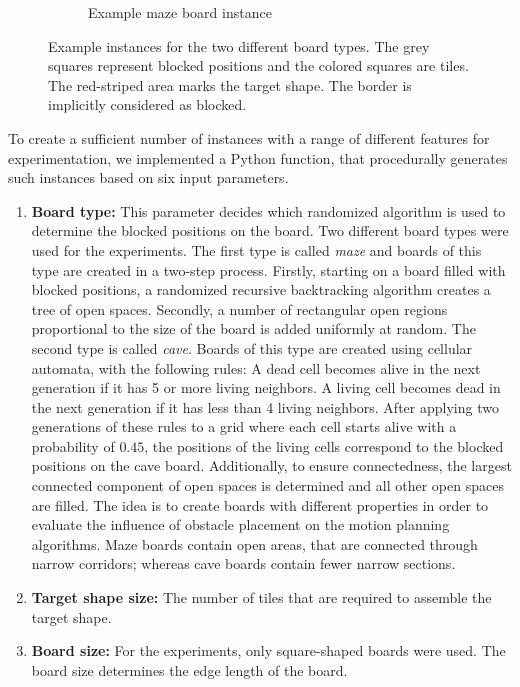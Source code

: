 \begin{figure}
\begin{subfigure}[b]{0.45\textwidth}
\caption{Example maze board instance}
\label{fig:maze}
\end{subfigure}
\caption[Example instances for the two different board types]{Example instances for the two different board types. The grey squares represent blocked positions and the colored squares are tiles. The red-striped area marks the target shape. The border is implicitly considered as blocked.}
\label{fig:instance_example}
\end{figure}

To create a sufficient number of instances with a range of different features for experimentation, we implemented a Python function, that procedurally generates such instances based on six input parameters.
\begin{enumerate}
\setlength\itemsep{-0.3em}
\item \textbf{Board type:} This parameter decides which randomized algorithm is used to determine the blocked positions on the board. Two different board types were used for the experiments. The first type is called \emph{maze} and boards of this type are created in a two-step process. Firstly, starting on a board filled with blocked positions, a randomized recursive backtracking algorithm creates a tree of open spaces. Secondly, a number of rectangular open regions proportional to the size of the board is added uniformly at random. The second type is called \emph{cave}. Boards of this type are created using cellular automata, with the following rules: A dead cell becomes alive in the next generation if it has 5 or more living neighbors. A living cell becomes dead in the next generation if it has less than 4 living neighbors. After applying two generations of these rules to a grid where each cell starts alive with a probability of $0.45$, the positions of the living cells correspond to the blocked positions on the cave board. Additionally, to ensure connectedness, the largest connected component of open spaces is determined and all other open spaces are filled. The idea is to create boards with different properties in order to evaluate the influence of obstacle placement on the motion planning algorithms. Maze boards contain open areas, that are connected through narrow corridors; whereas cave boards contain fewer narrow sections.
\item \textbf{Target shape size:}
The number of tiles that are required to assemble the target shape.
\item \textbf{Board size:}
For the experiments, only square-shaped boards were used. The board size determines the edge length of the board.

\end{enumerate}
